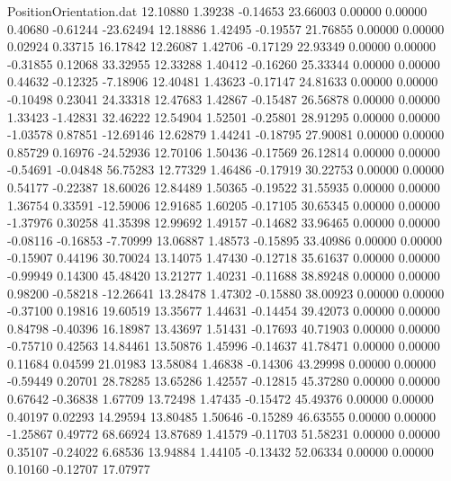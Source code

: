 \begin{filecontents}{PositionOrientation.dat}
  12.10880    1.39238   -0.14653    23.66003    0.00000    0.00000    0.40680   -0.61244  -23.62494
  12.18886    1.42495   -0.19557    21.76855    0.00000    0.00000    0.02924    0.33715   16.17842
  12.26087    1.42706   -0.17129    22.93349    0.00000    0.00000   -0.31855    0.12068   33.32955
  12.33288    1.40412   -0.16260    25.33344    0.00000    0.00000    0.44632   -0.12325   -7.18906
  12.40481    1.43623   -0.17147    24.81633    0.00000    0.00000   -0.10498    0.23041   24.33318
  12.47683    1.42867   -0.15487    26.56878    0.00000    0.00000    1.33423   -1.42831   32.46222
  12.54904    1.52501   -0.25801    28.91295    0.00000    0.00000   -1.03578    0.87851  -12.69146
  12.62879    1.44241   -0.18795    27.90081    0.00000    0.00000    0.85729    0.16976  -24.52936
  12.70106    1.50436   -0.17569    26.12814    0.00000    0.00000   -0.54691   -0.04848   56.75283
  12.77329    1.46486   -0.17919    30.22753    0.00000    0.00000    0.54177   -0.22387   18.60026
  12.84489    1.50365   -0.19522    31.55935    0.00000    0.00000    1.36754    0.33591  -12.59006
  12.91685    1.60205   -0.17105    30.65345    0.00000    0.00000   -1.37976    0.30258   41.35398
  12.99692    1.49157   -0.14682    33.96465    0.00000    0.00000   -0.08116   -0.16853   -7.70999
  13.06887    1.48573   -0.15895    33.40986    0.00000    0.00000   -0.15907    0.44196   30.70024
  13.14075    1.47430   -0.12718    35.61637    0.00000    0.00000   -0.99949    0.14300   45.48420
  13.21277    1.40231   -0.11688    38.89248    0.00000    0.00000    0.98200   -0.58218  -12.26641
  13.28478    1.47302   -0.15880    38.00923    0.00000    0.00000   -0.37100    0.19816   19.60519
  13.35677    1.44631   -0.14454    39.42073    0.00000    0.00000    0.84798   -0.40396   16.18987
  13.43697    1.51431   -0.17693    40.71903    0.00000    0.00000   -0.75710    0.42563   14.84461
  13.50876    1.45996   -0.14637    41.78471    0.00000    0.00000    0.11684    0.04599   21.01983
  13.58084    1.46838   -0.14306    43.29998    0.00000    0.00000   -0.59449    0.20701   28.78285
  13.65286    1.42557   -0.12815    45.37280    0.00000    0.00000    0.67642   -0.36838    1.67709
  13.72498    1.47435   -0.15472    45.49376    0.00000    0.00000    0.40197    0.02293   14.29594
  13.80485    1.50646   -0.15289    46.63555    0.00000    0.00000   -1.25867    0.49772   68.66924
  13.87689    1.41579   -0.11703    51.58231    0.00000    0.00000    0.35107   -0.24022    6.68536
  13.94884    1.44105   -0.13432    52.06334    0.00000    0.00000    0.10160   -0.12707   17.07977

\end{filecontents}
